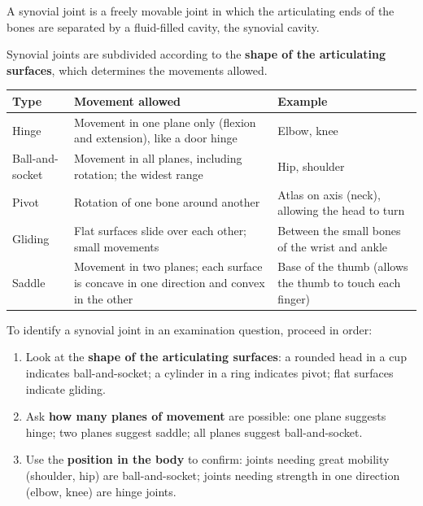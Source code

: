 \documentclass[11pt]{article}
\newcommand{\cle}[1]{{\popxbold\color{popdark}#1}}
\newcounter{popsec}
\newcounter{popsub}
\newcommand{\courssub}[1]{%
  \stepcounter{popsub}%
  \par\vspace{9pt}\noindent{\popxbold\fontsize{11.5}{13}\selectfont\color{popink}{\color{poporange}\thepopsec.\thepopsub}\hspace{6pt}#1}\par\nopagebreak\vspace{4pt}
}
\begin{document}
\courssub{Types of synovial joints}

\begin{definition}
A \cle{synovial joint} is a freely movable joint in which the articulating ends of the bones are separated by a fluid-filled cavity, the \cle{synovial cavity}.
\end{definition}

Synovial joints are subdivided according to the \textbf{shape of the articulating surfaces}, which determines the movements allowed.

\begin{center}
\begin{tabularx}{\linewidth}{|l|X|X|}
\hline
\rowcolor{popblueL} \textbf{Type} & \textbf{Movement allowed} & \textbf{Example} \\
\hline
Hinge & Movement in one plane only (flexion and extension), like a door hinge & Elbow, knee \\
\hline
Ball-and-socket & Movement in all planes, including rotation; the widest range & Hip, shoulder \\
\hline
Pivot & Rotation of one bone around another & Atlas on axis (neck), allowing the head to turn \\
\hline
Gliding & Flat surfaces slide over each other; small movements & Between the small bones of the wrist and ankle \\
\hline
Saddle & Movement in two planes; each surface is concave in one direction and convex in the other & Base of the thumb (allows the thumb to touch each finger) \\
\hline
\end{tabularx}
\end{center}

\begin{methode}
To identify a synovial joint in an examination question, proceed in order:
\begin{enumerate}
\item Look at the \textbf{shape of the articulating surfaces}: a rounded head in a cup indicates ball-and-socket; a cylinder in a ring indicates pivot; flat surfaces indicate gliding.
\item Ask \textbf{how many planes of movement} are possible: one plane suggests hinge; two planes suggest saddle; all planes suggest ball-and-socket.
\item Use the \textbf{position in the body} to confirm: joints needing great mobility (shoulder, hip) are ball-and-socket; joints needing strength in one direction (elbow, knee) are hinge joints.
\end{enumerate}
\end{methode}
\end{document}

